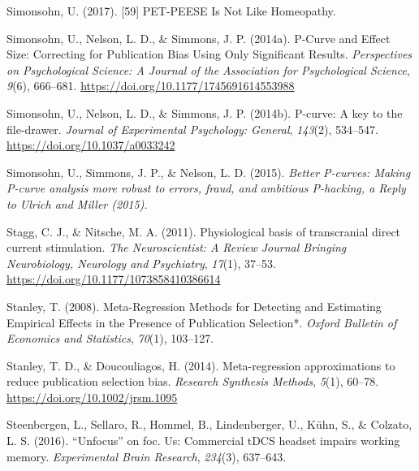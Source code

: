 \documentclass[
  man,floatsintext]{apa6}
\newlength{\cslhangindent}
\newlength{\cslentryspacingunit} %
\newenvironment{CSLReferences}[2] %
 {%
  \setlength{\parindent}{0pt}
  \ifodd #1
  \let\oldpar\par
  \def\par{\hangindent=\cslhangindent\oldpar}
  \fi
  \setlength{\parskip}{#2\cslentryspacingunit}
 }%
 {}
\begin{document}
\begin{CSLReferences}{1}{0}
\leavevmode{}%
Simonsohn, U. (2017). {[}59{]} {PET-PEESE Is Not Like Homeopathy}.

\leavevmode{}%
Simonsohn, U., Nelson, L. D., \& Simmons, J. P. (2014a). P-{Curve} and {Effect Size}: {Correcting} for {Publication Bias Using Only Significant Results}. \emph{Perspectives on Psychological Science: A Journal of the Association for Psychological Science}, \emph{9}(6), 666--681. \url{https://doi.org/10.1177/1745691614553988}

\leavevmode{}%
Simonsohn, U., Nelson, L. D., \& Simmons, J. P. (2014b). P-curve: {A} key to the file-drawer. \emph{Journal of Experimental Psychology: General}, \emph{143}(2), 534--547. \url{https://doi.org/10.1037/a0033242}

\leavevmode{}%
Simonsohn, U., Simmons, J. P., \& Nelson, L. D. (2015). \emph{Better {P-curves}: {Making P-curve} analysis more robust to errors, fraud, and ambitious {P-hacking}, a {Reply} to {Ulrich} and {Miller} (2015).}

\leavevmode{}%
Stagg, C. J., \& Nitsche, M. A. (2011). Physiological basis of transcranial direct current stimulation. \emph{The Neuroscientist: A Review Journal Bringing Neurobiology, Neurology and Psychiatry}, \emph{17}(1), 37--53. \url{https://doi.org/10.1177/1073858410386614}

\leavevmode{}%
Stanley, T. (2008). Meta-{Regression Methods} for {Detecting} and {Estimating Empirical Effects} in the {Presence} of {Publication Selection}*. \emph{Oxford Bulletin of Economics and Statistics}, \emph{70}(1), 103--127.

\leavevmode{}%
Stanley, T. D., \& Doucouliagos, H. (2014). Meta-regression approximations to reduce publication selection bias. \emph{Research Synthesis Methods}, \emph{5}(1), 60--78. \url{https://doi.org/10.1002/jrsm.1095}

\leavevmode{}%
Steenbergen, L., Sellaro, R., Hommel, B., Lindenberger, U., Kühn, S., \& Colzato, L. S. (2016). {``{Unfocus}''} on foc. Us: Commercial {tDCS} headset impairs working memory. \emph{Experimental Brain Research}, \emph{234}(3), 637--643.


\end{CSLReferences}
\end{document}
